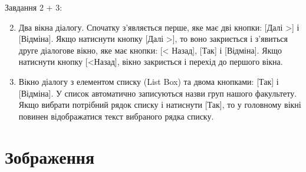 
\def\basedir{/home/theammir/labs/oop}


\usepackage{graphicx}


\def\thelabid{lab1}

\taskspec%
Завдання 2 + 3:
\begin{enumerate}
	\setcounter{enumi}{1}
	\item Два вікна діалогу. Спочатку з’являється перше, яке має дві кнопки: [Далі >]
		і [Відміна]. Якщо натиснути кнопку [Далі >], то воно закриється і з’явиться
		друге діалогове вікно, яке має кнопки: [< Назад], [Так] і [Відміна]. Якщо натиснути
		кнопку [<Назад], вікно закриється і перехід до першого вікна.
	\item Вікно діалогу з елементом списку (List Box) та двома кнопками: [Так] і
		[Відміна]. У список автоматично записуються назви груп нашого факультету. Якщо
		вибрати потрібний рядок списку і натиснути [Так], то у головному вікні повинен
		відображатися текст вибраного рядка списку.
\end{enumerate}

\codetext%

\section{Зображення}

